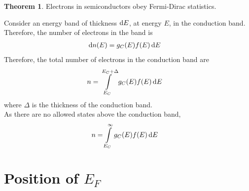 \documentclass[titlepage, fleqn, a4paper, 12pt, twoside]{article}
\theoremstyle{definition}
\theoremstyle{theorem}
\newtheorem{theorem}{Theorem}
\begin{document}
\begin{theorem}
	Electrons in semiconductors obey Fermi-Dirac statistics.
\end{theorem}

Consider an energy band of thickness $\dif E$, at energy $E$, in the conduction band.
Therefore, the number of electrons in the band is
\begin{align*}
	\dif n(E) & = g_C(E) f(E) \dif E
\end{align*}
Therefore, the total number of electrons in the conduction band are
\begin{align*}
	n & = \int\limits_{E_C}^{E_{C} + \Delta} g_C(E) f(E) \dif E
\end{align*}
where $\Delta$ is the thickness of the conduction band.\\
As there are no allowed states above the conduction band,
\begin{align*}
	n & = \int\limits_{E_C}^{\infty} g_C(E) f(E) \dif E
\end{align*}

\section{Position of $E_F$}
\end{document}
